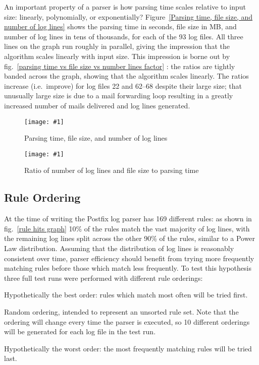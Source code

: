 \documentclass{svmult}
\newcommand{\showgraph}[3]{%
    \begin{figure}[btp]%
        \texttt{[image: \#1]}%
        \caption{#2}\label{#3}%
    \end{figure}%
}
\newcommand{\refwithlabel}[2]{%
    #1~\vref{#2}%
}
\newcommand{\graphref}[1]{%
    \refwithlabel{fig.}{#1}%
}
\newcommand{\Graphref}[1]{%
    \refwithlabel{Figure}{#1}%
}
\newcommand{\numberOFlogFILES}[0]{%
    93%
}
\newcommand{\numberOFrules}[0]{%
    169%
}
\begin{document}
An important property of a parser is how parsing time scales relative to
input size: linearly, polynomially, or exponentially?  \Graphref{Parsing
time, file size, and number of log lines} shows the parsing time in
seconds, file size in MB, and number of log lines in tens of thousands, for
each of the \numberOFlogFILES{} log files.  All three lines on the graph
run roughly in parallel, giving the impression that the algorithm scales
linearly with input size.  This impression is borne out by
\graphref{parsing time vs file size vs number lines factor}: the ratios are
tightly banded across the graph, showing that the algorithm scales
linearly.  The ratios increase (i.e.\ improve) for log files 22 and 62--68
despite their large size; that unusually large size is due to a mail
forwarding loop resulting in a greatly increased number of mails delivered
and log lines generated.

\showgraph{build/graph-input-size-vs-parsing-time}{Parsing time, file size,
and number of log lines}{Parsing time, file size, and number of log lines}
\showgraph{build/graph-input-size-vs-parsing-time-ratio}{Ratio of number of
log lines and file size to parsing time}{parsing time vs file size vs
number lines factor}

\subsection{Rule Ordering}

\label{Rule ordering}

At the time of writing the Postfix log parser has \numberOFrules{}
different rules: as shown in \graphref{rule hits graph} 10\% of the rules
match the vast majority of log lines, with the remaining log lines split
across the other 90\% of the rules, similar to a Power Law distribution.
Assuming that the distribution of log lines is reasonably consistent over
time, parser efficiency should benefit from trying more frequently matching
rules before those which match less frequently.  To test this hypothesis
three full test runs were performed with different rule orderings:

\begin{description}[optimal]

    \item [optimal]  Hypothetically the best order: rules which match most
        often will be tried first.

    \item [shuffle] Random ordering, intended to represent an unsorted rule
        set.  Note that the ordering will change every time the parser is
        executed, so 10 different orderings will be generated for each log
        file in the test run.

    \item [reverse] Hypothetically the worst order: the most frequently
        matching rules will be tried last.

\end{description}
\end{document}

